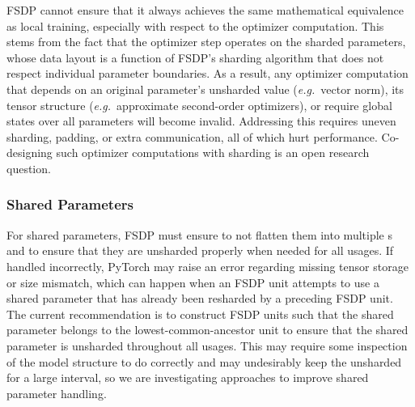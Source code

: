 FSDP cannot ensure that it always achieves the same mathematical equivalence as local training, especially with respect to the optimizer computation. This stems from the fact that the optimizer step operates on the sharded parameters, whose data layout is a function of FSDP's  sharding algorithm that does not respect individual parameter boundaries. As a result, any optimizer computation that depends on an original parameter's unsharded value (\emph{e.g.}~vector norm), its tensor structure (\emph{e.g.}~approximate second-order optimizers), or require global states over all parameters will become invalid. Addressing this requires uneven sharding, padding, or extra communication, all of which hurt performance. Co-designing such optimizer computations with sharding is an open research question.

\subsubsection{Shared Parameters} \hfill \break

For shared parameters, FSDP must ensure to not flatten them into multiple s and to ensure that they are unsharded properly when needed for all usages. If handled incorrectly, PyTorch may raise an error regarding missing tensor storage or size mismatch, which can happen when an FSDP unit attempts to use a shared parameter that has already been resharded by a preceding FSDP unit. The current recommendation is to construct FSDP units such that the shared parameter belongs to the lowest-common-ancestor unit to ensure that the shared parameter is unsharded throughout all usages. This may require some inspection of the model structure to do correctly and may undesirably keep the  unsharded for a large interval, so we are investigating approaches to improve shared parameter handling.